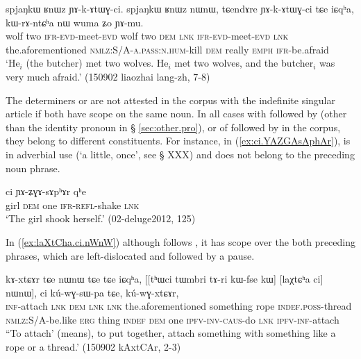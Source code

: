 \begin{exe} 
\ex \label{ex:RnWz.nWnW} 
 \gll spjaŋkɯ ʁnɯz ɲɤ-k-ɤtɯɣ-ci. spjaŋkɯ ʁnɯz nɯnɯ, tɕendɤre ɲɤ-k-ɤtɯɣ-ci tɕe iɕqʰa, kɯ-rɤ-ntɕʰa nɯ wuma ʑo ɲɤ-mu. \\ 
 wolf two \textsc{ifr}-\textsc{evd}-meet-\textsc{evd}  wolf two \textsc{dem} \textsc{lnk} \textsc{ifr}-\textsc{evd}-meet-\textsc{evd} \textsc{lnk} the.aforementioned \textsc{nmlz}:S/A-\textsc{a.pass}:\textsc{n.hum}-kill \textsc{dem} really \textsc{emph} \textsc{ifr}-be.afraid \\ 
 \glt `He$_i$ (the butcher) met two wolves. He$_i$ met two wolves, and the butcher$_i$ was very much afraid.' (150902 liaozhai lang-zh, 7-8)
\end{exe}

The determiners  or  are not attested in the corpus with the indefinite singular article  if both have scope on the same noun. In all cases with  followed by  (other than the identity pronoun in § \ref{sec:other.pro}), or of  followed by  in the corpus, they belong to different constituents. For instance, in (\ref{ex:ci.YAZGAsAphAr}),  is in adverbial use (`a little, once', see § XXX) and does not belong to the preceding noun phrase.  

\begin{exe}
\ex \label{ex:ci.YAZGAsAphAr}
\gll [tɕʰeme nɯ] ci ɲɤ-ʑɣɤ-sɤpʰɤr qʰe  \\
girl \textsc{dem} one \textsc{ifr}-\textsc{refl}-shake \textsc{lnk} \\
\glt `The girl shook herself.' (02-deluge2012, 125)
\end{exe}

In (\ref{ex:laXtCha.ci.nWnW}) although  follows , it has scope over the both preceding phrases, which are left-dislocated and followed by a pause.

\begin{exe}
\ex \label{ex:laXtCha.ci.nWnW}
\gll  kɤ-xtɕɤr tɕe nɯnɯ tɕe tɕe iɕqʰa, [[tʰɯci tɯmbri tɤ-ri kɯ-fse kɯ] [laχtɕʰa ci] nɯnɯ], ci kú-wɣ-sɯ-pa tɕe, kú-wɣ-xtɕɤr, \\
\textsc{inf}-attach \textsc{lnk} \textsc{dem} \textsc{lnk} \textsc{lnk} the.aforementioned something rope \textsc{indef}.\textsc{poss}-thread \textsc{nmlz}:S/A-be.like \textsc{erg} thing \textsc{indef} \textsc{dem} one \textsc{ipfv}-\textsc{inv}-\textsc{caus}-do \textsc{lnk} \textsc{ipfv}-\textsc{inf}-attach \\
\glt ``To attach' (means), to put together, attach something with something like a rope or a thread.'  (150902 kAxtCAr, 2-3)
\end{exe}

